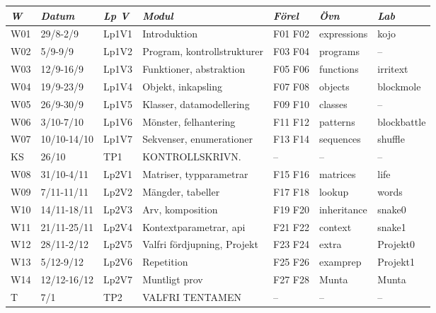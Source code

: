 \begin{tabular}{l|l|l|l|l|l|l}
\textit{W} & \textit{Datum} & \textit{Lp V} & \textit{Modul} & \textit{Förel} & \textit{Övn} & \textit{Lab} \\ \hline \hline
W01 & 29/8-2/9 & Lp1V1 & Introduktion & F01 F02 & expressions & kojo \\
W02 & 5/9-9/9 & Lp1V2 & Program, kontrollstrukturer & F03 F04 & programs & -- \\
W03 & 12/9-16/9 & Lp1V3 & Funktioner, abstraktion & F05 F06 & functions & irritext \\
W04 & 19/9-23/9 & Lp1V4 & Objekt, inkapsling & F07 F08 & objects & blockmole \\
W05 & 26/9-30/9 & Lp1V5 & Klasser, datamodellering & F09 F10 & classes & -- \\
W06 & 3/10-7/10 & Lp1V6 & Mönster, felhantering & F11 F12 & patterns & blockbattle \\
W07 & 10/10-14/10 & Lp1V7 & Sekvenser, enumerationer & F13 F14 & sequences & shuffle \\
KS & 26/10 & TP1 & KONTROLLSKRIVN. & -- & -- & -- \\
W08 & 31/10-4/11 & Lp2V1 & Matriser, typparametrar & F15 F16 & matrices & life \\
W09 & 7/11-11/11 & Lp2V2 & Mängder, tabeller & F17 F18 & lookup & words \\
W10 & 14/11-18/11 & Lp2V3 & Arv, komposition & F19 F20 & inheritance & snake0 \\
W11 & 21/11-25/11 & Lp2V4 & Kontextparametrar, api & F21 F22 & context & snake1 \\
W12 & 28/11-2/12 & Lp2V5 & Valfri fördjupning, Projekt & F23 F24 & extra & Projekt0 \\
W13 & 5/12-9/12 & Lp2V6 & Repetition & F25 F26 & examprep & Projekt1 \\
W14 & 12/12-16/12 & Lp2V7 & Muntligt prov & F27 F28 & Munta & Munta \\
T & 7/1 & TP2 & VALFRI TENTAMEN & -- & -- & -- \\
\end{tabular}

